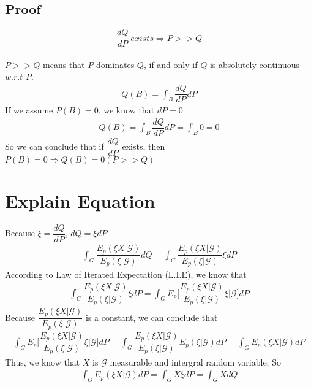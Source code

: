 \documentclass[12pt]{article}
\begin{document}
\subsection*{Proof}
\[\dfrac{dQ}{dP}\ exists \Rightarrow P >> Q\] \\
$P >> Q$ means that $P$ dominates $Q$, if and only if $Q$ is absolutely continuous $w.r.t$ $P$.
\begin{align*}
    Q(B) = \int_B \dfrac{dQ}{dP}dP
\end{align*}
If we assume $P(B)=0$, we know that $dP=0$
\begin{align*}
    Q(B) = \int_B \dfrac{dQ}{dP}dP = \int_B 0 = 0  
\end{align*}
So we can conclude that if $\dfrac{dQ}{dP}$ exists, then $P(B) = 0 \Rightarrow Q(B)=0(P >> Q)$
\section{Explain Equation}
Because $\xi = \dfrac{dQ}{dP}$, $dQ = \xi dP$
\begin{align*}
    \int_G\dfrac{E_p(\xi X|\mathcal{G})}{E_p(\xi|\mathcal{G})}dQ = \int_G\dfrac{E_p(\xi X|\mathcal{G})}{E_p(\xi|\mathcal{G})}\xi dP
\end{align*}
According to Law of Iterated Expectation (L.I.E), we know that
\begin{align*}
    \int_G\dfrac{E_p(\xi X|\mathcal{G})}{E_p(\xi|\mathcal{G})}\xi dP = \int_G E_p\Bigg[\dfrac{E_p (\xi X|\mathcal{G})}{E_p (\xi |\mathcal{G})}\xi \Bigg|\mathcal{G}\Bigg]dP
\end{align*}
Because $\dfrac{E_p (\xi X|\mathcal{G})}{E_p (\xi|\mathcal{G})}$ is a constant, we can conclude that
\begin{align*} 
    \int_G E_p\Bigg[\dfrac{E_p (\xi X|\mathcal{G})}{E_p (\xi |\mathcal{G})}\xi \Bigg|\mathcal{G}\Bigg]dP = \int_G \dfrac{E_p (\xi X|\mathcal{G})}{E_p(\xi|\mathcal{G})}E_p(\xi|\mathcal{G})dP = \int_G E_p(\xi X|\mathcal{G})dP
\end{align*}
Thus, we know that $X$ is $\mathcal{G}$ measurable and intergral random variable, So
\begin{align*}
    \int_G E_p(\xi X |\mathcal{G})dP = \int_G X \xi dP = \int_G X dQ
\end{align*}
\end{document}
